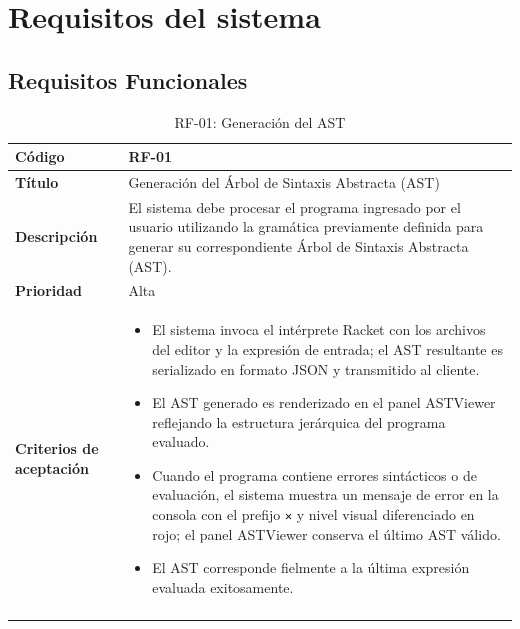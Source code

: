 \chapter{Requisitos del sistema}
\label{annex:rf}

\section{Requisitos Funcionales}

\begin{longtable}{|>{\bfseries}p{3cm}|p{11cm}|}
\hline
\textbf{Código} & RF-01 \\
\hline
\textbf{Título} & Generación del Árbol de Sintaxis Abstracta (AST) \\
\hline
\textbf{Descripción} & El sistema debe procesar el programa ingresado por el usuario utilizando la gramática previamente definida para generar su correspondiente Árbol de Sintaxis Abstracta (AST). \\
\hline
\textbf{Prioridad} & Alta \\
\hline
\textbf{Criterios de aceptación} &
\begin{itemize}[leftmargin=*,topsep=2pt,itemsep=1pt,parsep=0pt]
    \item El sistema invoca el intérprete Racket con los archivos del editor y la expresión de entrada; el AST resultante es serializado en formato JSON y transmitido al cliente.
    \item El AST generado es renderizado en el panel ASTViewer reflejando la estructura jerárquica del programa evaluado.
    \item Cuando el programa contiene errores sintácticos o de evaluación, el sistema muestra un mensaje de error en la consola con el prefijo \texttt{✕} y nivel visual diferenciado en rojo; el panel ASTViewer conserva el último AST válido.
    \item El AST corresponde fielmente a la última expresión evaluada exitosamente.
\end{itemize} \\
\hline
\caption{RF-01: Generación del AST}
\label{tab:rf01}
\end{longtable}

